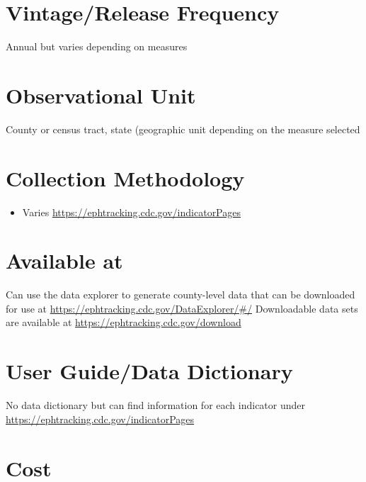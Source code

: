 \documentclass[
]{book}
\providecommand{\tightlist}{%
  \setlength{\itemsep}{0pt}\setlength{\parskip}{0pt}}
\begin{document}
\hypertarget{vintagerelease-frequency-47}{%
\section{Vintage/Release Frequency}\label{vintagerelease-frequency-47}}

Annual but varies depending on measures

\hypertarget{observational-unit-47}{%
\section{Observational Unit}\label{observational-unit-47}}

County or census tract, state (geographic unit depending on the measure selected

\hypertarget{collection-methodology-47}{%
\section{Collection Methodology}\label{collection-methodology-47}}

\begin{itemize}
\tightlist
\item
  Varies \url{https://ephtracking.cdc.gov/indicatorPages}
\end{itemize}

\hypertarget{available-at-47}{%
\section{Available at}\label{available-at-47}}

Can use the data explorer to generate county-level data that can be downloaded for use at \url{https://ephtracking.cdc.gov/DataExplorer/\#/} Downloadable data sets are available at \url{https://ephtracking.cdc.gov/download}

\hypertarget{user-guidedata-dictionary-47}{%
\section{User Guide/Data Dictionary}\label{user-guidedata-dictionary-47}}

No data dictionary but can find information for each indicator under \url{https://ephtracking.cdc.gov/indicatorPages}

\hypertarget{cost-47}{%
\section{Cost}\label{cost-47}}
\end{document}
